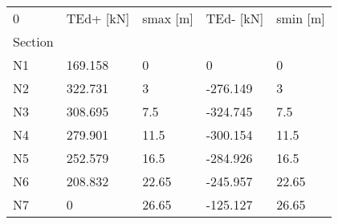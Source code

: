 \begin{tabular}{lllll}
\toprule
0 & TEd+ [kN] & smax [m] & TEd- [kN] & smin [m] \\
Section &           &          &           &          \\
\midrule
N1      &   169.158 &        0 &         0 &        0 \\
N2      &   322.731 &        3 &  -276.149 &        3 \\
N3      &   308.695 &      7.5 &  -324.745 &      7.5 \\
N4      &   279.901 &     11.5 &  -300.154 &     11.5 \\
N5      &   252.579 &     16.5 &  -284.926 &     16.5 \\
N6      &   208.832 &    22.65 &  -245.957 &    22.65 \\
N7      &         0 &    26.65 &  -125.127 &    26.65 \\
\bottomrule
\end{tabular}
